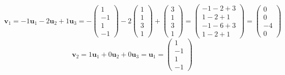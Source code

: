 \documentclass[11pt]{article}
\theoremstyle{definition}
\theoremstyle{remark}
\newcommand{\vecu}{\mathbf{u}}
\newcommand{\vecv}{\mathbf{v}}
\begin{document}
    \[ \vecv_1 = -1 \vecu_1 - 2 \vecu_2 + 1 \vecu_3 = -\begin{pmatrix} 1 \\ -1 \\ 1 \\ -1 \end{pmatrix} - 2 \begin{pmatrix} 1 \\ 1 \\ 3 \\ 1 \end{pmatrix} + \begin{pmatrix} 3 \\ 1 \\ 3 \\ 1 \end{pmatrix} = \begin{pmatrix} -1-2+3 \\ 1-2+1 \\ -1-6+3 \\ 1-2+1 \end{pmatrix} = \begin{pmatrix} 0 \\ 0 \\ -4 \\ 0 \end{pmatrix} \]
    \[ \vecv_2 = 1 \vecu_1 + 0 \vecu_2 + 0 \vecu_3 = \vecu_1 = \begin{pmatrix} 1 \\ -1 \\ 1 \\ -1 \end{pmatrix} \]
\end{document}

